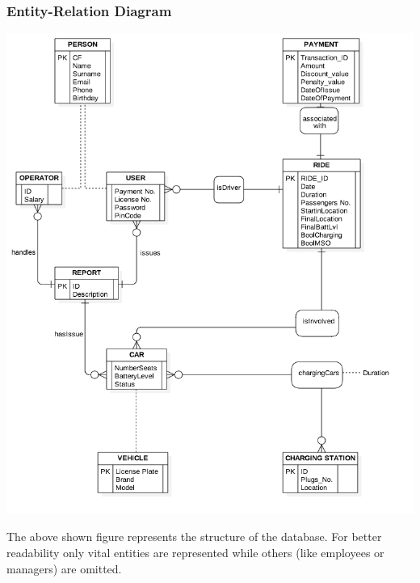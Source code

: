 \subsubsection{Entity-Relation Diagram}
\begin{center}
\includegraphics[scale=0.35]{Images/ER/ER.png}
\end{center}
The above shown figure represents the structure of the database. For better readability only vital entities are represented while others (like employees or managers) are omitted.
